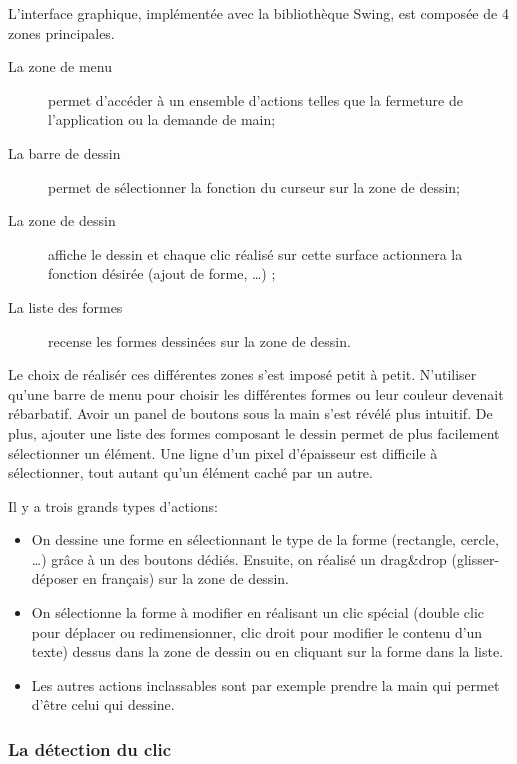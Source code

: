 \documentclass[a4paper,11pt]{article}
\begin{document}
L'interface graphique, impl\'ement\'ee avec la bibliothèque Swing, est compos\'ee de 4 zones principales.

\begin{description}
 \item[La zone de menu] permet d'acc\'eder \`a un ensemble d'actions telles que la fermeture de l'application ou la demande de main;
 \item[La barre de dessin] permet de s\'electionner la fonction du curseur sur la zone de dessin;
 \item[La zone de dessin] affiche le dessin et chaque clic r\'ealis\'e sur cette surface actionnera la fonction d\'esir\'ee (ajout de forme, \ldots) ;
 \item[La liste des formes] recense les formes dessin\'ees sur la zone de dessin.
\end{description}

Le choix de r\'ealis\'er ces diff\'erentes zones s'est impos\'e petit \`a petit. N'utiliser qu'une barre de menu pour choisir les diff\'erentes formes ou leur couleur devenait r\'ebarbatif. Avoir un panel de boutons sous la main s'est r\'ev\'el\'e plus intuitif. De plus, ajouter une liste des formes composant le dessin permet de plus facilement s\'electionner un \'el\'ement. Une ligne d'un pixel d'\'epaisseur est difficile \`a s\'electionner, tout autant qu'un \'el\'ement cach\'e par un autre. 

Il y a trois grands types d'actions: 

\begin{itemize}
 \item[Dessiner:] On dessine une forme en s\'electionnant le type de la forme (rectangle, cercle, \ldots) gr\^ace \`a un des boutons d\'edi\'es. Ensuite, on r\'ealis\'e un \og drag\&drop \fg (\og glisser-d\'eposer \fg en fran\c{c}ais) sur la zone de dessin.
 
 \item[Modifier:] On s\'electionne la forme \`a modifier en r\'ealisant un clic sp\'ecial (double clic pour d\'eplacer ou redimensionner, clic droit pour modifier le contenu d'un texte) dessus dans la zone de dessin ou en cliquant sur la forme dans la liste. 
 
 \item[Autres:] Les autres actions inclassables sont par exemple \og prendre la main \fg qui permet d'\^etre celui qui dessine.
\end{itemize}

\subsubsection{La d\'etection du clic}
\end{document}
